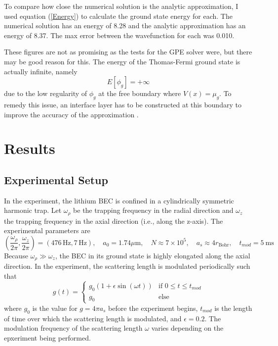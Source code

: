 \documentclass[12]{article}
\begin{document}
To compare how close the numerical solution is the analytic approximation, I used equation (\ref{Energy}) to calculate the ground state energy for each. The numerical solution has an energy of 8.28 and the analytic approximation has an energy of 8.37. The max error between the wavefunction for each was 0.010. 

These figures are not as promising as the tests for the GPE solver were, but there may be good reason for this. The energy of the Thomas-Fermi ground state is actually infinite, namely
\begin{equation}
E[\phi_g] = +\infty
\end{equation}
due to the low regularity of $\phi_g$ at the free boundary where $V(x) = \mu_g$. To remedy this issue, an interface layer has to be constructed at this boundary to improve the accuracy of the approximation \cite{bao2003ground}.

\section{Results}

\subsection{Experimental Setup}

In the experiment, the lithium BEC is confined in a cylindrically symmetric harmonic trap. Let $\omega_\rho$ be the trapping frequency in the radial direction and $\omega_z$ the trapping frequency in the axial direction (i.e., along the z-axis). The experimental parameters are 
\begin{equation}
\left(\frac{\omega_{\rho}}{2 \pi}, \frac{\omega_{z}}{2 \pi}\right)=(476 \,\mathrm{Hz},7 \,\mathrm{Hz}) , \quad a_{0}=1.74 \mu \mathrm{m}, \quad N \approx 7 \times 10^{5}, \quad a_s \approx 4r_{\text{Bohr}}, \quad t_{mod} = 5~\textrm{ms}
\end{equation}
Because $\omega_\rho \gg \omega_z$, the BEC in its ground state is highly elongated along the axial direction. In the experiment, the scattering length is modulated periodically such that
\begin{equation}
  g(t) =
  \begin{cases}
		g_0(1 + \epsilon \sin(\omega t)) & \text{if $0\leq t \leq t_{mod}$} \\
		g_0 & \text{else}
  \end{cases}
\end{equation}
where $g_0$ is the value for $g = 4\pi a_s$ before the experiment begins, $t_{mod}$ is the length of time over which the scattering length is modulated, and $\epsilon = 0.2$. The modulation frequency of the scattering length $\omega$ varies depending on the epxeriment being performed. 
\end{document}
